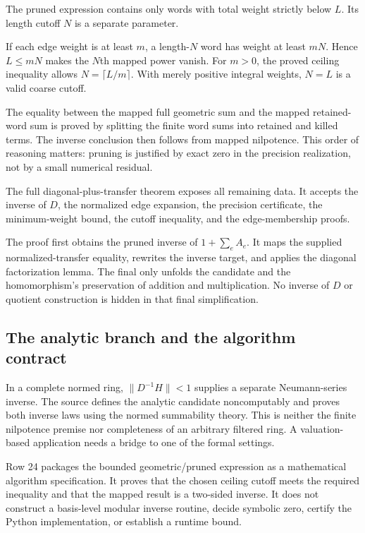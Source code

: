 The pruned expression contains only words with total weight strictly below $L$. Its length cutoff $N$ is a separate parameter.

If each edge weight is at least $m$, a length-$N$ word has weight at least $mN$. Hence $L\le mN$ makes the $N$th mapped power vanish. For $m>0$, the proved ceiling inequality allows $N=\lceil L/m\rceil$. With merely positive integral weights, $N=L$ is a valid coarse cutoff.

The equality between the mapped full geometric sum and the mapped retained-word sum is proved by splitting the finite word sums into retained and killed terms. The inverse conclusion then follows from mapped nilpotence. This order of reasoning matters: pruning is justified by exact zero in the precision realization, not by a small numerical residual.

The full diagonal-plus-transfer theorem exposes all remaining data. It accepts the inverse of $D$, the normalized edge expansion, the precision certificate, the minimum-weight bound, the cutoff inequality, and the edge-membership proofs.

The proof first obtains the pruned inverse of $1+\sum_eA_e$. It maps the supplied normalized-transfer equality, rewrites the inverse target, and applies the diagonal factorization lemma. The final  only unfolds the candidate and the homomorphism's preservation of addition and multiplication. No inverse of $D$ or quotient construction is hidden in that final simplification.

\subsection{The analytic branch and the algorithm contract}

In a complete normed ring, $\|D^{-1}H\|<1$ supplies a separate Neumann-series inverse. The source defines the analytic candidate noncomputably and proves both inverse laws using the normed summability theory. This is neither the finite nilpotence premise nor completeness of an arbitrary filtered ring. A valuation-based application needs a bridge to one of the formal settings.

Row 24 packages the bounded geometric/pruned expression as a mathematical algorithm specification. It proves that the chosen ceiling cutoff meets the required inequality and that the mapped result is a two-sided inverse. It does not construct a basis-level modular inverse routine, decide symbolic zero, certify the Python implementation, or establish a runtime bound.

